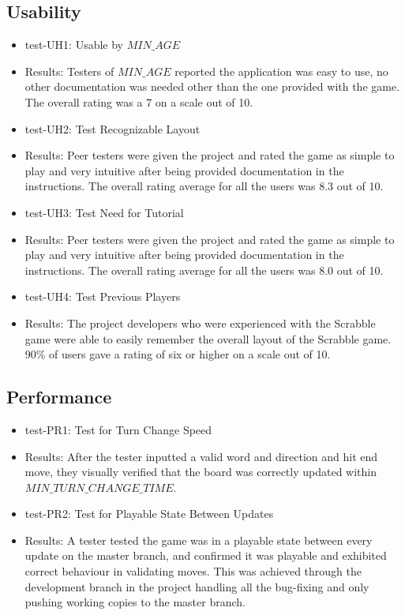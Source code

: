 \documentclass[12pt, titlepage]{article}
\begin{document}
\subsection{Usability}
\begin{itemize}
    \item test-UH1: Usable by $MIN\_AGE$
    \item Results: Testers of $MIN\_AGE$ reported the application was easy to use, no other documentation was needed other than the one provided with the game. The overall rating was a 7 on a scale out of 10.
    \item test-UH2: Test Recognizable Layout
    \item Results: Peer testers were given the project and rated the game as simple to play and very intuitive after being provided documentation in the instructions. The overall rating average for all the users was 8.3 out of 10.
    \item test-UH3: Test Need for Tutorial
    \item Results: Peer testers were given the project and rated the game as simple to play and very intuitive after being provided documentation in the instructions. The overall rating average for all the users was 8.0 out of 10. 
    \item test-UH4: Test Previous Players
    \item Results: The project developers who were experienced with the Scrabble game were able to easily remember the overall layout of the Scrabble game. 90\% of users gave a rating of six or higher on a scale out of 10.
\end{itemize}

\subsection{Performance}
\begin{itemize}
    \item test-PR1: Test for Turn Change Speed
    \item Results: After the tester inputted a valid word and direction and hit end move, they visually verified that the board was correctly updated within $MIN\_TURN\_CHANGE\_TIME$.
    \item test-PR2: Test for Playable State Between Updates
    \item Results: A tester tested the game was in a playable state between every update on the master branch, and confirmed it was playable and exhibited correct behaviour in validating moves. This was achieved through the development branch in the project handling all the bug-fixing and only pushing working copies to the master branch. 
\end{itemize}
\end{document}

